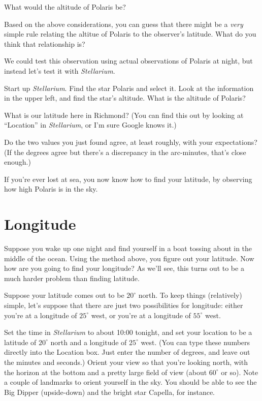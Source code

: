 \vskip 1in

What would the altitude of Polaris be?

\vskip 1in

Based on the above considerations, you can guess that there might
be a \textit{very} simple rule relating the altitue of Polaris
to the observer's latitude. What do you think that relationship is?

\vskip 1in

We could test this observation using actual observations of Polaris at
night, but instead let's test it with \textit{Stellarium}. 

Start up \textit{Stellarium}. 
Find the star Polaris and select it. Look at the information in
the upper left, and find the star's altitude. What is the altitude of
Polaris?

\vskip 1in

What is our latitude here in Richmond? (You can find this out by looking
at ``Location'' in \textit{Stellarium}, or I'm sure Google knows it.)
\vskip 1in

Do the two values you just found agree, at least roughly, with your
expectations? (If the degrees agree but there's a discrepancy in the
arc-minutes, that's close enough.)

\vskip 1in

If you're ever lost at sea, you now know how to find your latitude,
by observing how high Polaris is in the sky.

\section*{Longitude}

Suppose you wake up one night and find yourself in a boat tossing about
in the middle of the ocean. Using the method above, you figure out
your latitude. Now how are you going to find your longitude? As we'll see,
this
turns out to be a much harder problem than finding latitude.

Suppose your
latitude comes out to be $20^\circ$ north. 
To keep things (relatively) simple, let's suppose that there
are just two possibilities
for longitude: either you're at a longitude of $25^\circ$ west,
or you're at a longitude of $55^\circ$ west. 

Set the time in \textit{Stellarium} to about 10:00 tonight,
and set your location to be a latitude of $20^\circ$ north and
a longitude of $25^\circ$ west. (You can type these numbers
directly into the Location box. Just enter the
number of degrees, and leave out the minutes and
seconds.) Orient your view so that you're looking north,
with the horizon at the bottom and a pretty large 
field of view (about $60^\circ$ or so). Note a couple of
landmarks to orient yourself in the sky. You should be able
to see the Big Dipper (upside-down) and the bright star Capella, for
instance.

